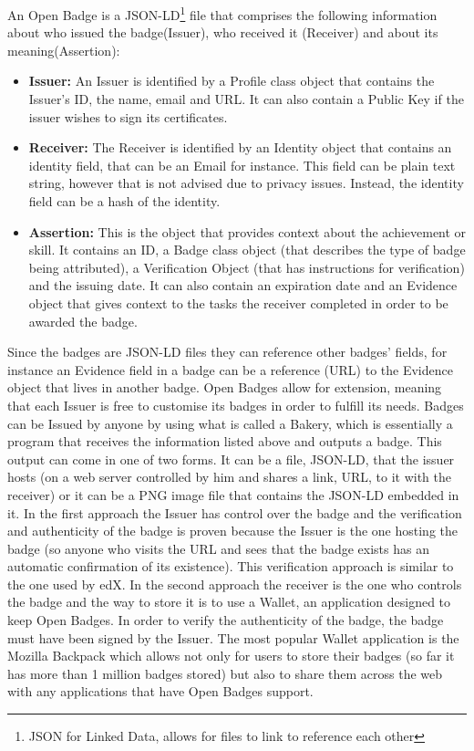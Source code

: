\documentclass[llncsdoc]{llncs}
\begin{document}
An Open Badge is a JSON-LD\footnote{JSON for Linked Data, allows for files to link to reference each other} file that comprises the following information about who issued the badge(Issuer), who received it (Receiver) and about its meaning(Assertion):
\begin{itemize}
\item \textbf{Issuer:} An Issuer is identified by a Profile class object that contains the Issuer's ID, the name, email and URL. It can also contain a Public Key if the issuer wishes to sign its certificates.
\item \textbf{Receiver:} The Receiver is identified by an Identity object that contains an identity field, that can be an Email for instance. This field can be plain text string, however that is not advised due to privacy issues. Instead, the identity field can be a hash of the identity.
\item \textbf{Assertion:} This is the object that provides context about the achievement or skill. It contains an ID, a Badge class object (that describes the type of badge being attributed), a Verification Object (that has instructions for verification) and the issuing date. It can also contain an expiration date and an Evidence object that gives context to the tasks the receiver completed in order to be awarded the badge.
\end{itemize}
Since the badges are JSON-LD files they can reference other badges' fields, for instance an Evidence field in a badge can be a reference (URL) to the Evidence object that lives in another badge.
Open Badges allow for extension, meaning that each Issuer is free to customise its badges in order to fulfill its needs.
Badges can be Issued by anyone by using what is called a Bakery, which is essentially a program that receives the information listed above and outputs a badge. This output can come in one of two forms. It can be a file, JSON-LD, that the issuer hosts (on a web server controlled by him and shares a link, URL, to it with the receiver) or it can be a PNG image file that contains the JSON-LD embedded in it. In the first approach the Issuer has control over the badge and the verification and authenticity of the badge is proven because the Issuer is the one hosting the badge (so anyone who visits the URL and sees that the badge exists has an automatic confirmation of its existence). This verification approach is similar to the one used by edX. In the second approach the receiver is the one who controls the badge and the way to store it is to use a Wallet, an application designed to keep Open Badges. In order to verify the authenticity of the badge, the badge must have been signed by the Issuer. The most popular Wallet application is the Mozilla Backpack which allows not only for users to store their badges (so far it has more than 1 million badges stored) but also to share them across the web with any applications that have Open Badges support.
\end{document}
